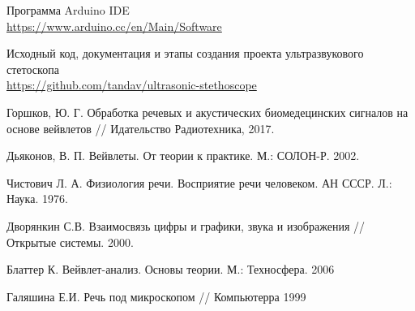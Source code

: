 \documentclass[../paper.tex]{subfiles}
\begin{document}
\begin{thebibliography}{}
Программа Arduino IDE\\
\url{https://www.arduino.cc/en/Main/Software}

Исходный код, документация и этапы создания проекта ультразвукового стетоскопа\\
\url{https://github.com/tandav/ultrasonic-stethoscope}

Горшков, Ю. Г. Обработка речевых и акустических биомедецинских сигналов на основе вейвлетов // Идательство Радиотехника, 2017.

Дьяконов, В. П. Вейвлеты. От теории к практике. М.: СОЛОН-Р. 2002.

Чистович Л. А. Физиология речи. Восприятие речи человеком. АН СССР. Л.: Наука. 1976.

Дворянкин С.В. Взаимосвязь цифры и графики, звука и изображения // Открытые системы. 2000.

Блаттер К. Вейвлет-анализ. Основы теории. М.: Техносфера. 2006

Галяшина Е.И. Речь под микроскопом // Компьютерра 1999

\end{thebibliography}
\end{document}
